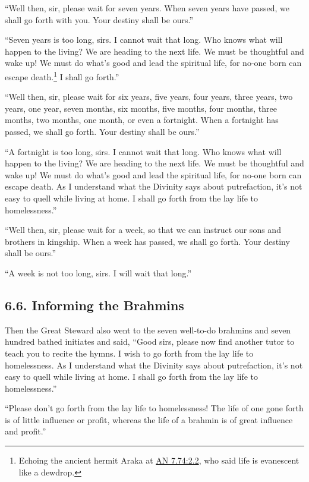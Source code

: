 \documentclass[12pt,openany]{book}%
\begin{document}
“Well then, sir, please wait for seven years. When seven years have passed, we shall go forth with you. Your destiny shall be ours.” 

“Seven years is too long, sirs. I cannot wait that long. Who knows what will happen to the living? We are heading to the next life. We must be thoughtful and wake up! We must do what’s good and lead the spiritual life, for no-one born can escape death.\footnote{Echoing the ancient hermit Araka at \href{https://suttacentral.net/an7.74/en/sujato\#2.2}{AN 7.74:2.2}, who said life is evanescent like a dewdrop. } I shall go forth.” 

“Well then, sir, please wait for six years, five years, four years, three years, two years, one year, seven months, six months, five months, four months, three months, two months, one month, or even a fortnight. When a fortnight has passed, we shall go forth. Your destiny shall be ours.” 

“A fortnight is too long, sirs. I cannot wait that long. Who knows what will happen to the living? We are heading to the next life. We must be thoughtful and wake up! We must do what’s good and lead the spiritual life, for no-one born can escape death. As I understand what the Divinity says about putrefaction, it’s not easy to quell while living at home. I shall go forth from the lay life to homelessness.” 

“Well then, sir, please wait for a week, so that we can instruct our sons and brothers in kingship. When a week has passed, we shall go forth. Your destiny shall be ours.” 

“A week is not too long, sirs. I will wait that long.” 

\subsection*{6.6. Informing the Brahmins }

Then the Great Steward also went to the seven well-to-do brahmins and seven hundred bathed initiates and said, “Good sirs, please now find another tutor to teach you to recite the hymns. I wish to go forth from the lay life to homelessness. As I understand what the Divinity says about putrefaction, it’s not easy to quell while living at home. I shall go forth from the lay life to homelessness.” 

“Please don’t go forth from the lay life to homelessness! The life of one gone forth is of little influence or profit, whereas the life of a brahmin is of great influence and profit.” 
\end{document}
